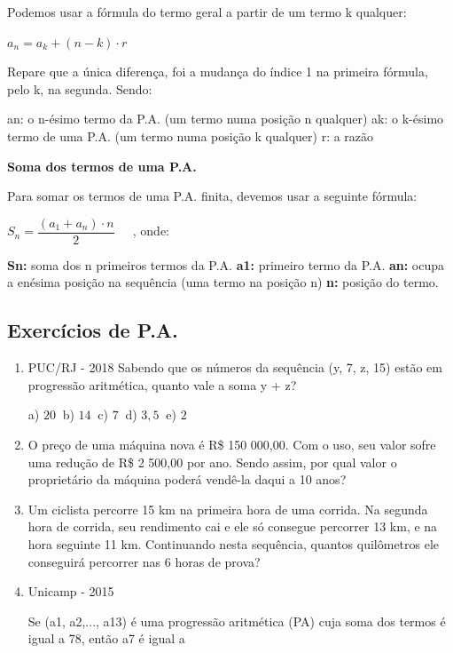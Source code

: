 \begin{multicols*}{2}
    Podemos usar a fórmula do termo geral a partir de um termo k qualquer:

    $ a_n = a_k + (n - k) \cdot r $

    Repare que a única diferença, foi a mudança do índice 1 na primeira fórmula, pelo k, na segunda. Sendo:

    an: o n-ésimo termo da P.A. (um termo numa posição n qualquer)
    ak: o k-ésimo termo de uma P.A. (um termo numa posição k qualquer)
    r: a razão

    \textbf{Soma dos termos de uma P.A.}

    Para somar os termos de uma P.A. finita, devemos usar a seguinte fórmula:

    $ S_n = \dfrac{(a_1 + a_n) \cdot n}{2} \ \ \ \ \ $	, onde:

    \textbf{Sn:} soma dos n primeiros termos da P.A.
    \textbf{a1:} primeiro termo da P.A.
    \textbf{an:} ocupa a enésima posição na sequência (uma termo na posição n)
    \textbf{n:} posição do termo.

    \subsection{Exercícios de P.A.}

    \begin{enumerate}

        \item PUC/RJ - 2018 Sabendo que os números da sequência (y, 7, z, 15) estão em progressão aritmética, quanto vale a soma y + z?

              a) $20 \ $ b) $14 \ $ c) $7 \ $ d) $3,5 \ $ e) $2 $

        \item O preço de uma máquina nova é R\$ 150 000,00. Com o uso, seu valor sofre uma redução de R\$ 2 500,00 por ano. Sendo assim, por qual valor o proprietário da máquina poderá vendê-la daqui a 10 anos?

        \item Um ciclista percorre 15 km na primeira hora de uma corrida. Na segunda hora de corrida, seu rendimento cai e ele só consegue percorrer 13 km, e na hora seguinte 11 km. Continuando nesta sequência, quantos quilômetros ele conseguirá percorrer nas 6 horas de prova?

        \item Unicamp - 2015

              Se (a1, a2,..., a13) é uma progressão aritmética (PA) cuja soma dos termos é igual a 78, então a7 é igual a


\end{enumerate}
\end{multicols*}
